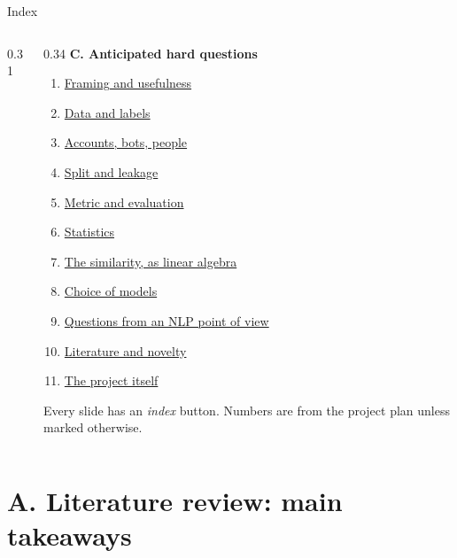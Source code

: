 \documentclass[aspectratio=169,10pt]{beamer}
\begin{document}
\begin{frame}[label=index]{Index}
\begin{columns}[T]
\begin{column}{0.31\textwidth}
    \end{column}
    \begin{column}{0.34\textwidth}
      \textbf{C. Anticipated hard questions}
      \begin{enumerate}\setlength{\itemsep}{0pt}
        \item \hyperlink{qframe}{Framing and usefulness}
        \item \hyperlink{qdata}{Data and labels}
        \item \hyperlink{qbots}{Accounts, bots, people}
        \item \hyperlink{qsplit}{Split and leakage}
        \item \hyperlink{qeval}{Metric and evaluation}
        \item \hyperlink{qstats}{Statistics}
        \item \hyperlink{qmath}{The similarity, as linear algebra}
        \item \hyperlink{qmodel}{Choice of models}
        \item \hyperlink{qnlp}{Questions from an NLP point of view}
        \item \hyperlink{qlit}{Literature and novelty}
        \item \hyperlink{qproj}{The project itself}
      \end{enumerate}
      \vspace{4pt}
      {\scriptsize\color{grey} Every slide has an \emph{index} button. Numbers are from the project plan unless marked otherwise.}
    \end{column}
  \end{columns}
\end{frame}

\section{A. Literature review: main takeaways}
\end{document}
